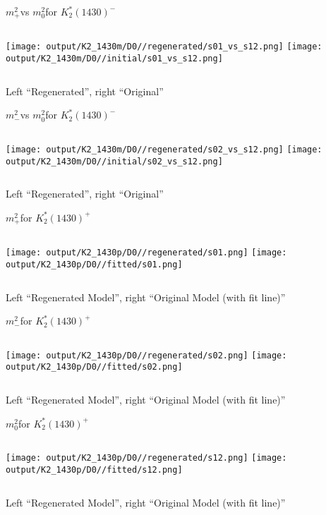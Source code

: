 \documentclass{beamer}
\newcommand{\MP}{\ensuremath{m^2_+}}
\newcommand{\MM}{\ensuremath{m^2_-}}
\newcommand{\MZ}{\ensuremath{m^2_0}}
\begin{document}
\begin{frame}{\MP vs \MZ for $K_2^*(1430)^-$}
\begin{columns}[t]
\centering
\texttt{[image: output/K2\_1430m/D0//regenerated/s01\_vs\_s12.png]}
\centering
\texttt{[image: output/K2\_1430m/D0//initial/s01\_vs\_s12.png]}
\end{columns}
    \centering
    Left ``Regenerated'', right ``Original''
\end{frame} 


\begin{frame}{\MM vs \MZ for $K_2^*(1430)^-$}
\begin{columns}[t]
\centering
\texttt{[image: output/K2\_1430m/D0//regenerated/s02\_vs\_s12.png]}
\centering
\texttt{[image: output/K2\_1430m/D0//initial/s02\_vs\_s12.png]}
\end{columns}
    \centering
    Left ``Regenerated'', right ``Original''
\end{frame} 

\begin{frame}{\MP for $K_2^*(1430)^+$}
\begin{columns}[t]
\centering
\texttt{[image: output/K2\_1430p/D0//regenerated/s01.png]}
\centering
\texttt{[image: output/K2\_1430p/D0//fitted/s01.png]}
\end{columns}
    \centering
    Left ``Regenerated Model'', right ``Original Model (with fit line)''
\end{frame}                   

\begin{frame}{\MM for $K_2^*(1430)^+$}
\begin{columns}[t]
\centering
\texttt{[image: output/K2\_1430p/D0//regenerated/s02.png]}
\centering
\texttt{[image: output/K2\_1430p/D0//fitted/s02.png]}
\end{columns}
    \centering
    Left ``Regenerated Model'', right ``Original Model (with fit line)''
\end{frame}                   

\begin{frame}{\MZ for $K_2^*(1430)^+$}
\begin{columns}[t]
\centering
\texttt{[image: output/K2\_1430p/D0//regenerated/s12.png]}
\centering
\texttt{[image: output/K2\_1430p/D0//fitted/s12.png]}
\end{columns}
    \centering
    Left ``Regenerated Model'', right ``Original Model (with fit line)''
\end{frame}                   
\end{document}
